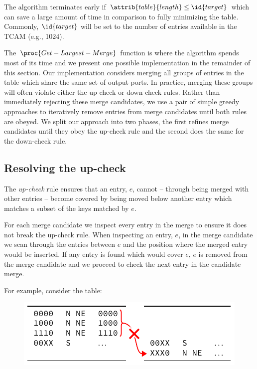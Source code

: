 \documentclass[conference]{IEEEtran}
\begin{document}
  The algorithm terminates early if $\attrib{table}{length} \le \id{target}$ which can save a large amount of time in comparison to fully minimizing the table.
  Commonly, $\id{target}$ will be set to the number of entries available in the TCAM (e.g., 1024).

  The $\proc{Get-Largest-Merge}$ function is where the algorithm spends most of its time and we present one possible implementation in the remainder of this section.
  Our implementation considers merging all groups of entries in the table which share the same set of output ports.
  In practice, merging these groups will often violate either the up-check or down-check rules.
  Rather than immediately rejecting these merge candidates, we use a pair of simple greedy approaches to iteratively remove entries from merge candidates until both rules are obeyed.
  We split our approach into two phases, the first refines merge candidates until they obey the up-check rule and the second does the same for the down-check rule.

  \subsection{Resolving the up-check}

  The \textit{up-check} rule ensures that an entry, $e$, cannot -- through being merged with other entries -- become covered by being moved below another entry which matches a subset of the keys matched by $e$.
  
  For each merge candidate we inspect every entry in the merge to ensure it does not break the up-check rule.
  When inspecting an entry, $e$, in the merge candidate we scan through the entries between $e$ and the position where the merged entry would be inserted.
  If any entry is found which would cover $e$, $e$ is removed from the merge candidate and we proceed to check the next entry in the candidate merge.

  For example, consider the table:\par\nopagebreak
  \begin{figure}[H]
    \centering
    \includegraphics{figures/upcheck_resolve_example_1}
  \end{figure}
\end{document}

